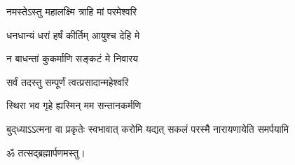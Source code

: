 {नमस्तेऽस्तु महालक्ष्मि त्राहि मां परमेश्वरि}

{धनधान्यं धरां हर्षं कीर्तिम् आयुश्च देहि मे}

{न बाधन्तां कुकर्माणि सङ्कटं मे निवारय}


{सर्वं तदस्तु सम्पूर्णं त्वत्प्रसादान्महेश्वरि}

{स्थिरा भव गृहे ह्यस्मिन् मम सन्तानकर्मणि}


{बुद्‌ध्याऽऽत्मना वा प्रकृतेः स्वभावात्}
{करोमि यद्यत् सकलं परस्मै}
{नारायणायेति समर्पयामि}

ॐ तत्सद्ब्रह्मार्पणमस्तु।